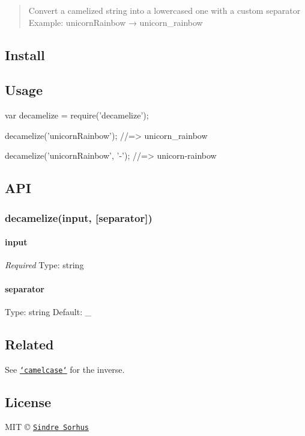 \begin{quote}
Convert a camelized string into a lowercased one with a custom separator Example\+: {\ttfamily unicorn\+Rainbow} → {\ttfamily unicorn\+\_\+rainbow} \end{quote}


\subsection*{Install}




\subsection*{Usage}


\begin{DoxyCode}
var decamelize = require(\textcolor{stringliteral}{'decamelize'});

decamelize(\textcolor{stringliteral}{'unicornRainbow'});
\textcolor{comment}{//=> unicorn\_rainbow}

decamelize(\textcolor{stringliteral}{'unicornRainbow'}, \textcolor{charliteral}{'-'});
\textcolor{comment}{//=> unicorn-rainbow}
\end{DoxyCode}


\subsection*{A\+P\+I}

\subsubsection*{decamelize(input, \mbox{[}separator\mbox{]})}

\paragraph*{input}

{\itshape Required} Type\+: {\ttfamily string}

\paragraph*{separator}

Type\+: {\ttfamily string} Default\+: {\ttfamily \+\_\+}

\subsection*{Related}

See \href{https://github.com/sindresorhus/camelcase}{\tt `camelcase`} for the inverse.

\subsection*{License}

M\+I\+T © \href{http://sindresorhus.com}{\tt Sindre Sorhus} 